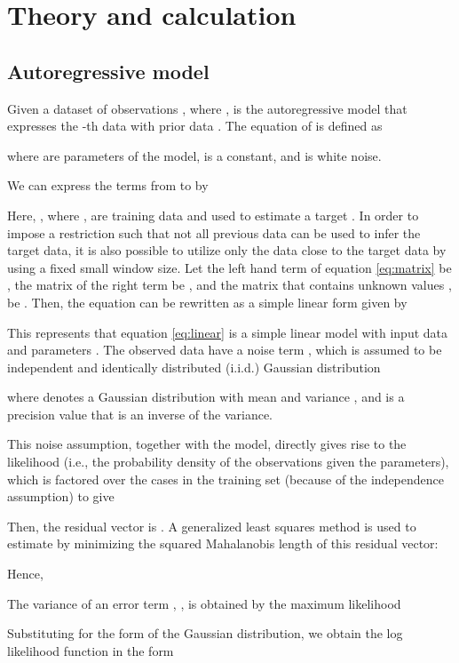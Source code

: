 \documentclass[final,authoryear,5p,times,twocolumn]{elsarticle}
\begin{document}
\section{Theory and calculation}
\label{section:Sec3}



\subsection{Autoregressive model}
\label{section:Sec3.1}
Given a dataset of  observations , where ,  is the autoregressive model that expresses the -th data with  prior data . The equation of  is defined as

where  are parameters of the model,  is a constant, and  is white noise.

We can express the terms from  to  by


Here, , where , are training data and used to estimate a target . In order to impose a restriction such that not all previous data can be used to infer the target data, it is also possible to utilize only the data close to the target data by using a fixed small window size. Let the left hand term of equation \eqref{eq:matrix} be , the  matrix of the right term be , and the matrix that contains unknown values , be . Then, the equation can be rewritten as a simple linear form given by


This represents that equation \eqref{eq:linear} is a simple linear model with input data  and parameters . The observed data  have a noise term , which is assumed to be independent and identically distributed (i.i.d.) Gaussian distribution

where  denotes a Gaussian distribution with mean  and variance , and  is a precision value that is an inverse of the variance.

This noise assumption, together with the model, directly gives rise to the likelihood (i.e., the probability density of the observations given the parameters), which is factored over the cases in the training set (because of the independence assumption) to give \citep[chap. 2]{Gaussian06}


Then, the residual vector is . A generalized least squares method is used to estimate  by minimizing the squared Mahalanobis length of this residual vector:

Hence,


The variance of an error term , , is obtained by the maximum likelihood

Substituting  for the form of the Gaussian distribution, we obtain the log likelihood function in the form \citep[chap. 1]{bishop07}
\end{document}
